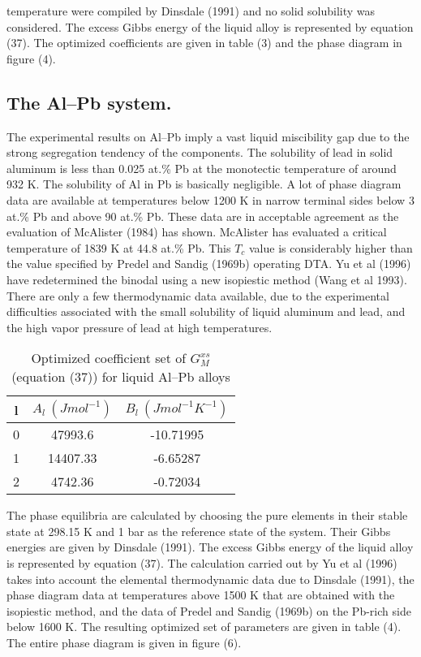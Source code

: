 \documentclass[12pt]{article}
\newcommand*{\1}{\hspace{1pt}}
\begin{document}
    temperature were compiled by Dinsdale (1991) and no solid 
    solubility was considered. The excess Gibbs energy of the 
    liquid alloy is represented by equation (37). The optimized 
    coefficients are given in table (3) and the phase diagram in 
    figure (4).\\



    \subsection{ The Al–Pb system.}

    The experimental results on Al–Pb imply a vast liquid
    miscibility gap due to the strong segregation tendency of the components. The solubility of
    lead in solid aluminum is less than 0.025 at.\% Pb at the monotectic temperature of around
    932 K. The solubility of Al in Pb is basically negligible. A lot of phase diagram data are
    available at temperatures below 1200 K in narrow terminal sides below 3 at.\% Pb and above 90 
    at.\% Pb. These data are in acceptable agreement as the evaluation of McAlister (1984) has 
    shown. McAlister has evaluated a critical temperature of 1839 K at 44.8 at.\% Pb. This $T _c$
    value is considerably higher than the value specified by Predel and Sandig (1969b) operating
    DTA. Yu et al (1996) have redetermined the binodal using a new isopiestic method (Wang et al 
    1993). There are only a few thermodynamic data available, due to the experimental
    difficulties associated with the small solubility of liquid aluminum and lead, and the high
    vapor pressure of lead at high temperatures.\\ 
    \begin{table}[t!]
        \centering
        \caption{Optimized coefficient set of $G ^ {xs} _ {M}$ 
        (equation (37)) for liquid Al–Pb alloys}
        \begin{tabular}{|c | c | c|} 
        \hline
        l & $A_l \ (J mol^{-1})$ & $B_l \ (J mol^{-1}K^{-1})$ \\ [0.5ex] 
        \hline\hline
        0 & 47993.6 & -10.71995  \\ 
        1 & 14407.33 & -6.65287  \\
        2 & 4742.36 & -0.72034  \\ [1ex] 
        \hline
        \end{tabular}
        \end{table}

    The phase equilibria are calculated by choosing the pure elements in their stable state at 
    298.15 K and 1 bar as the reference state of the system. Their Gibbs energies are given by 
    Dinsdale (1991). The excess Gibbs energy of the liquid alloy is represented by equation (37). 
    The calculation carried out by Yu et al (1996) takes into account the elemental thermodynamic 
    data due to Dinsdale (1991), the phase diagram data at
    temperatures above 1500 K that are obtained with the isopiestic method, and the data of Predel 
    and Sandig (1969b) on the Pb-rich side below 1600 K. The resulting optimized set of parameters 
    are given in table (4). The entire phase diagram is given in figure (6). 
\end{document}
